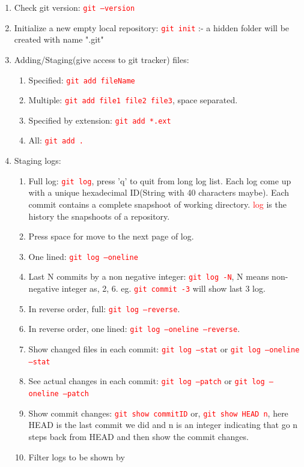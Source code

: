 \documentclass[12 pt, letterpaper]{extarticle}
\newcommand{\R}{\textcolor{red}} %
\newcommand{\T}{\texttt}
\begin{document}
\begin{enumerate}
	\item Check git version: \R{\T{git --version}}
	\item Initialize a new empty local repository: \R{\T{git init}} :- a hidden folder will be created with name ".git"

	\item Adding/Staging(give access to git tracker) files:
		\begin{enumerate}
			\item Specified: \R{\T{git add fileName}}
			\item Multiple: \R{\T{git add file1 file2 file3}}, space separated.
			\item Specified by extension: \R{\T{git add *.ext}}
			\item All: \R{\T{git add .}}
		\end{enumerate}
	\item Staging logs:
		\begin{enumerate}
			\item Full log: \R{\T{git log}}, press 'q' to quit from long log list. Each log come up with a unique hexadecimal ID(String with 40 characters maybe). Each commit contains a complete snapshoot of working directory. \R{log} is the history the snapshoots of a repository.
			\item Press space for move to the next page of log.
			\item One lined: \R{\T{git log --oneline}}
			\item Last N commits by a non negative integer: \R{\T{git log -N}}, N means non-negative integer as, 2, 6. eg. \R{\T{git commit -3}} will show last 3 log.
			\item In reverse order, full: \R{\T{git log --reverse}}.
			\item In reverse order, one lined: \R{\T{git log --oneline --reverse}}.
			\item Show changed files in each commit: \R{\T{git log --stat}} or \R{\T{git log --oneline --stat}}
			\item See actual changes in each commit: \R{\T{git log --patch}} or \R{\T{git log --oneline --patch}}
			\item Show commit changes: \R{\T{git show commitID}} or, \R{\T{git show HEAD~n}}, here HEAD is the last commit we did and n is an integer indicating that go n steps back from HEAD and then show the commit changes.
			\item Filter logs to be shown by
				\begin{enumerate}

\end{enumerate}
\end{enumerate}
\end{enumerate}
\end{document}
